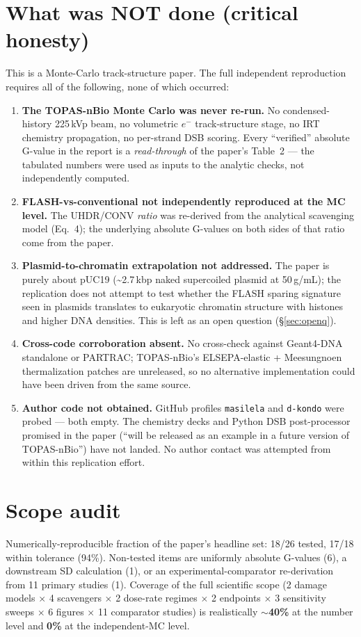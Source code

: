 \documentclass[11pt]{article}
\begin{document}
\section{What was NOT done (critical honesty)}
This is a Monte-Carlo track-structure paper. The full independent reproduction
requires all of the following, none of which occurred:
\begin{enumerate}
  \item \textbf{The TOPAS-nBio Monte Carlo was never re-run.} No condensed-history
        225\,kVp beam, no volumetric $e^{-}$ track-structure stage, no IRT
        chemistry propagation, no per-strand DSB scoring. Every ``verified''
        absolute G-value in the report is a \emph{read-through} of the paper's
        Table~2 --- the tabulated numbers were used as inputs to the analytic
        checks, not independently computed.
  \item \textbf{FLASH-vs-conventional not independently reproduced at the MC
        level.} The UHDR/CONV \emph{ratio} was re-derived from the analytical
        scavenging model (Eq.~4); the underlying absolute G-values on both sides
        of that ratio come from the paper.
  \item \textbf{Plasmid-to-chromatin extrapolation not addressed.} The paper is
        purely about pUC19 (\textasciitilde 2.7\,kbp naked supercoiled plasmid at
        50\,\textmu g/mL); the replication does not attempt to test whether the
        FLASH sparing signature seen in plasmids translates to eukaryotic
        chromatin structure with histones and higher DNA densities. This is
        left as an open question (\S\ref{sec:openq}).
  \item \textbf{Cross-code corroboration absent.} No cross-check against
        Geant4-DNA standalone or PARTRAC; TOPAS-nBio's ELSEPA-elastic + Meesungnoen
        thermalization patches are unreleased, so no alternative implementation
        could have been driven from the same source.
  \item \textbf{Author code not obtained.} GitHub profiles \texttt{masilela} and
        \texttt{d-kondo} were probed --- both empty. The chemistry decks and
        Python DSB post-processor promised in the paper (``will be released as
        an example in a future version of TOPAS-nBio'') have not landed. No
        author contact was attempted from within this replication effort.
\end{enumerate}

\section{Scope audit}
Numerically-reproducible fraction of the paper's headline set: 18/26 tested,
17/18 within tolerance (94\%). Non-tested items are uniformly absolute G-values
(6), a downstream SD calculation (1), or an experimental-comparator
re-derivation from 11 primary studies (1). Coverage of the full scientific
scope (2 damage models $\times$ 4 scavengers $\times$ 2 dose-rate regimes
$\times$ 2 endpoints $\times$ 3 sensitivity sweeps $\times$ 6 figures $\times$
11 comparator studies) is realistically \textbf{$\sim$40\%} at the number
level and \textbf{0\%} at the independent-MC level.
\end{document}
